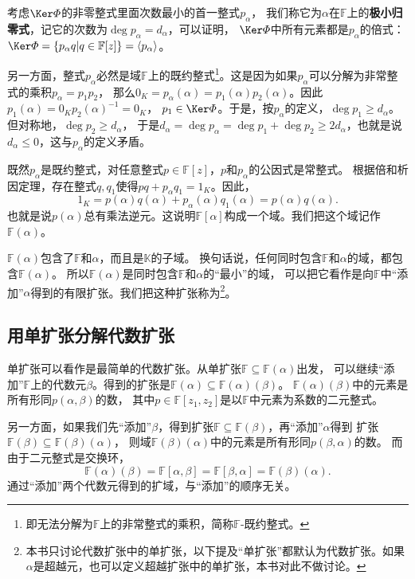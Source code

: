 \documentclass[12pt,UTF8,fontset=none]{ctexbook}
\begin{document}
\begin{appendix}
考虑$\Ker\varPhi$的非零整式里面次数最小的首一整式$p_\alpha$，
我们称它为$\alpha$在$\mathbb{F}$上的\textbf{极小归零式}，记它的次数为$\deg p_\alpha = d_\alpha$，可以证明，
$\Ker\varPhi$中所有元素都是$p_\alpha$的倍式：$\Ker\varPhi = \{p_\alpha q | q \in \mathbb{F}[z]\} = \langle p_\alpha \rangle $。

另一方面，整式$p_\alpha$必然是域$\mathbb{F}$上的既约整式\footnote{即无法分解为$\mathbb{F}$上的非常整式的乘积，简称$\mathbb{F}$-既约整式。}。这是因为如果$p_\alpha$可以分解为非常整式的乘积$p_\alpha = p_1p_2$，
那么$0_K = p_\alpha(\alpha) = p_1(\alpha)p_2(\alpha)$。因此$p_1(\alpha) = 0_K p_2(\alpha)^{-1} = 0_K$，
$p_1\in \Ker\varPhi$。于是，按$p_\alpha$的定义，$\deg p_1 \geqslant d_\alpha$。但对称地，$\deg p_2 \geqslant d_\alpha$，
于是$d_\alpha = \deg p_\alpha = \deg p_1 + \deg p_2 \geqslant 2d_\alpha$，也就是说$d_\alpha \leqslant 0$，这与$p_\alpha$的定义矛盾。

既然$p_\alpha$是既约整式，对任意整式$p \in\mathbb{F}[z]$，$p$和$p_\alpha$的公因式是常整式。
根据倍和析因定理，存在整式$q, q_1$使得$pq + p_\alpha q_1 = 1_K$。因此，
$$1_K = p(\alpha)q(\alpha) + p_\alpha(\alpha)q_1(\alpha) = p(\alpha)q(\alpha).$$
也就是说$p(\alpha)$总有乘法逆元。这说明$\mathbb{F}[\alpha]$构成一个域。我们把这个域记作$\mathbb{F}(\alpha)$。

$\mathbb{F}(\alpha)$包含了$\mathbb{F}$和$\alpha$，而且是$\mathbb{K}$的子域。
换句话说，任何同时包含$\mathbb{F}$和$\alpha$的域，都包含$\mathbb{F}(\alpha)$。
所以$\mathbb{F}(\alpha)$是同时包含$\mathbb{F}$和$\alpha$的“最小”的域，
可以把它看作是向$\mathbb{F}$中“添加”$\alpha$得到的有限扩张。我们把这种扩张称为\footnote{本书只讨论代数扩张中的单扩张，以下提及“单扩张”都默认为代数扩张。如果$\alpha$是超越元，也可以定义超越扩张中的单扩张，本书对此不做讨论。}。

\subsection{用单扩张分解代数扩张}
单扩张可以看作是最简单的代数扩张。从单扩张$\mathbb{F} \subseteq \mathbb{F}(\alpha)$出发，
可以继续“添加”$\mathbb{F}$上的代数元$\beta$。得到的扩张是$\mathbb{F}(\alpha) \subseteq \mathbb{F}(\alpha)(\beta)$。
$\mathbb{F}(\alpha)(\beta)$中的元素是所有形同$p(\alpha, \beta)$的数，
其中$p\in \mathbb{F}[z_1, z_2]$是以$\mathbb{F}$中元素为系数的二元整式。

另一方面，如果我们先“添加”$\beta$，得到扩张$\mathbb{F} \subseteq \mathbb{F}(\beta)$，再“添加”$\alpha$得到
扩张$\mathbb{F}(\beta) \subseteq \mathbb{F}(\beta)(\alpha)$，
则域$\mathbb{F}(\beta)(\alpha)$中的元素是所有形同$p(\beta, \alpha)$的数。
而由于二元整式是交换环，
$$\mathbb{F}(\alpha)(\beta) = \mathbb{F}[\alpha, \beta] = \mathbb{F}[\beta, \alpha] = \mathbb{F}(\beta)(\alpha).$$
通过“添加”两个代数元得到的扩域，与“添加”的顺序无关。


\end{appendix}
\end{document}
